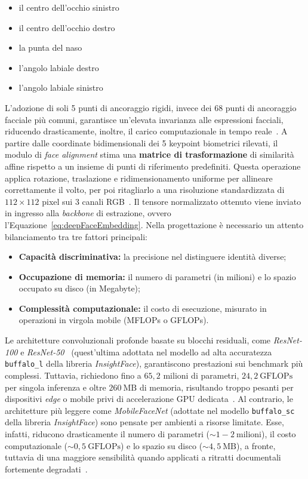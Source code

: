 \begin{itemize}
    \item il centro dell'occhio sinistro
    \item il centro dell'occhio destro
    \item la punta del naso
    \item l'angolo labiale destro
    \item l'angolo labiale sinistro
\end{itemize}
L'adozione di soli 5 punti di ancoraggio rigidi, invece dei 68 punti di ancoraggio facciale più comuni, garantisce un'elevata invarianza alle espressioni facciali, riducendo drasticamente, inoltre, il carico computazionale in tempo reale~\cite{sawetsutipunFacialImageVerification2020a}.
A partire dalle coordinate bidimensionali dei 5 keypoint biometrici rilevati, il modulo di \textit{face alignment} stima una \textbf{matrice di trasformazione} di similarità affine rispetto a un insieme di punti di riferimento predefiniti.
Questa operazione applica rotazione, traslazione e ridimensionamento uniforme per allineare correttamente il volto, per poi ritagliarlo a una risoluzione standardizzata di $112 \times 112$ pixel sui 3 canali RGB~\cite{georgeLightweightCrossSpectralFace2026}.
Il tensore normalizzato ottenuto viene inviato in ingresso alla \textit{backbone} di estrazione, ovvero l'Equazione~\eqref{eq:deepFaceEmbedding}. 
Nella progettazione è necessario un attento bilanciamento tra tre fattori principali:
\begin{itemize}
    \item \textbf{Capacità discriminativa:} la precisione nel distinguere identità diverse;
    \item \textbf{Occupazione di memoria:} il numero di parametri (in milioni) e lo spazio occupato su disco (in Megabyte);
    \item \textbf{Complessità computazionale:} il costo di esecuzione, misurato in operazioni in virgola mobile (MFLOPs o GFLOPs).
\end{itemize}
Le architetture convoluzionali profonde basate su blocchi residuali, come \textit{ResNet-100} e \textit{ResNet-50}~\cite{kimAdaFaceQualityAdaptive2023,github-insightface} (quest'ultima adottata nel modello ad alta accuratezza \texttt{buffalo\_l} della libreria \textit{InsightFace}), garantiscono prestazioni sui benchmark più complessi. 
Tuttavia, richiedono fino a $65{,}2$ milioni di parametri, $24{,}2~\text{GFLOPs}$ per singola inferenza e oltre $260~\text{MB}$ di memoria, risultando troppo pesanti per dispositivi \textit{edge} o mobile privi di accelerazione GPU dedicata~\cite{hassanpourLightweightFaceRecognition2023}.
Al contrario, le architetture più leggere come \textit{MobileFaceNet} (adottate nel modello \texttt{buffalo\_sc} della libreria \textit{InsightFace}) sono pensate per ambienti a risorse limitate. Esse, infatti, riducono drasticamente il numero di parametri ($\sim 1{-}2~\text{milioni}$), il costo computazionale ($\sim 0{,}5~\text{GFLOPs}$) e lo spazio su disco ($\sim 4{,}5~\text{MB}$), a fronte, tuttavia di una maggiore sensibilità quando applicati a ritratti documentali fortemente degradati~\cite{sawetsutipunFacialImageVerification2020a}.

